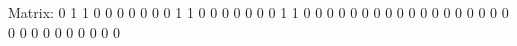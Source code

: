 \documentclass{article}
\begin{document}
Matrix: 
0 1 1 0 0 0 0
0 0 0 1 1 0 0
0 0 0 0 0 1 1
0 0 0 0 0 0 0
0 0 0 0 0 0 0
0 0 0 0 0 0 0
0 0 0 0 0 0 0
\end{document}
